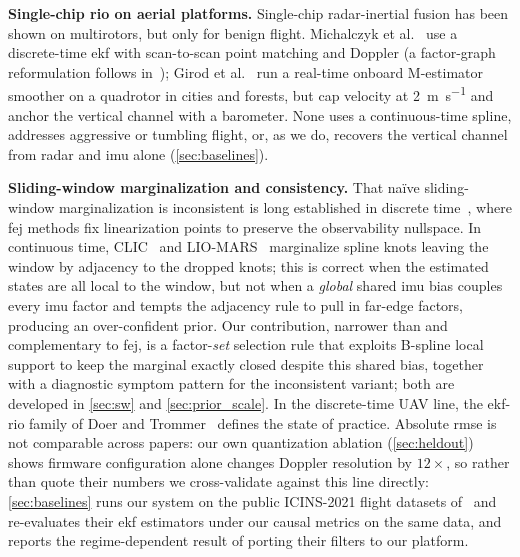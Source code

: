 \textbf{Single-chip \ac{rio} on aerial platforms.}
Single-chip radar-inertial fusion has been shown on multirotors, but only
for benign flight.  Michalczyk et al.~\cite{michalczyk2022ekf} use a
discrete-time \ac{ekf} with scan-to-scan point matching and Doppler (a
factor-graph reformulation follows in~\cite{michalczyk2024fg}); Girod et
al.~\cite{girod2024brio} run a real-time onboard M-estimator smoother on a
quadrotor in cities and forests, but cap velocity at
\SI{2}{\metre\per\second} and anchor the vertical channel with a
barometer.  None uses a continuous-time spline, addresses aggressive or
tumbling flight, or, as we do, recovers the vertical channel from radar
and \ac{imu} alone (\autoref{sec:baselines}).

\textbf{Sliding-window marginalization and consistency.}
That na\"ive sliding-window marginalization is inconsistent is long
established in discrete time~\cite{dongsi2012consistency}, where \ac{fej}
methods fix linearization points to preserve the observability nullspace.
In continuous time, CLIC~\cite{lv2023clic} and
LIO-MARS~\cite{quenzel2025liomars} marginalize spline knots leaving the
window by adjacency to the dropped knots; this is correct when the
estimated states are all local to the window, but not when a
\emph{global} shared \ac{imu} bias couples every \ac{imu} factor and
tempts the adjacency rule to pull in far-edge factors, producing an
over-confident prior.  Our contribution, narrower than and complementary
to \ac{fej}, is a factor-\emph{set} selection rule that exploits B-spline
local support to keep the marginal exactly closed despite this shared
bias, together with a diagnostic symptom pattern for the inconsistent
variant; both are developed in \autoref{sec:sw} and
\autoref{sec:prior_scale}.
In the discrete-time UAV line, the \ac{ekf}-\ac{rio} family of Doer and
Trommer~\cite{doer2020ekf} defines the state of practice.
Absolute \ac{rmse} is not comparable across papers: our own quantization
ablation (\autoref{sec:heldout}) shows firmware configuration alone
changes Doppler resolution by $12\times$, so rather than quote their
numbers we cross-validate against this line directly:
\autoref{sec:baselines} runs our system on the
public ICINS-2021 flight datasets of~\cite{doer2021yrio} and re-evaluates
their \ac{ekf} estimators under our causal metrics on the same data, and
reports the regime-dependent result of porting their filters to our
platform.

